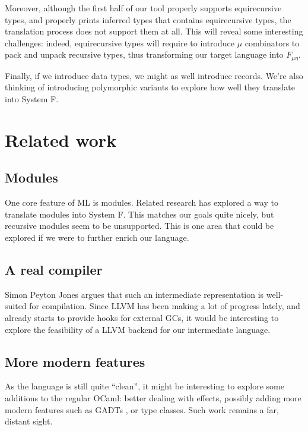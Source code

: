 \documentclass[10pt,a4paper,twoside,titlepage,twocolumn]{article}
\begin{document}
Moreover, although the first half of our tool properly supports equirecursive
types, and properly prints inferred types that contains equirecursive types, the
translation process does not support them at all.  This will reveal some
interesting challenges: indeed, equirecursive types will require to introduce
$\mu$ combinators to pack and unpack recursive types, thus transforming our
target language into $F_{\mu\eta}$.

Finally, if we introduce data types, we might as well introduce records. We're
also thinking of introducing polymorphic variants to explore how well they
translate into System F.

\section{Related work}

\subsection{Modules}

One core feature of ML is modules. Related research \cite{rossberg2010f} has
explored a way to translate modules into System F. This matches our goals quite
nicely, but recursive modules seem to be unsupported. This is one area that
could be explored if we were to further enrich our language.

\subsection{A real compiler}

Simon Peyton Jones argues \cite{sulzmann2007system} that such an intermediate
representation is well-suited for compilation. Since LLVM \cite{llvm} has been
making a lot of progress lately, and already starts to provide hooks for
external GCs, it would be interesting to explore the feasibility of a LLVM
backend for our intermediate language.

\subsection{More modern features}

As the language is still quite ``clean'', it might be interesting to explore
some additions to the regular OCaml: better dealing with effects, possibly
adding more modern features such as GADTs \cite{simonet2004constraint}, or type
classes. Such work remains a far, distant sight.
\end{document}
